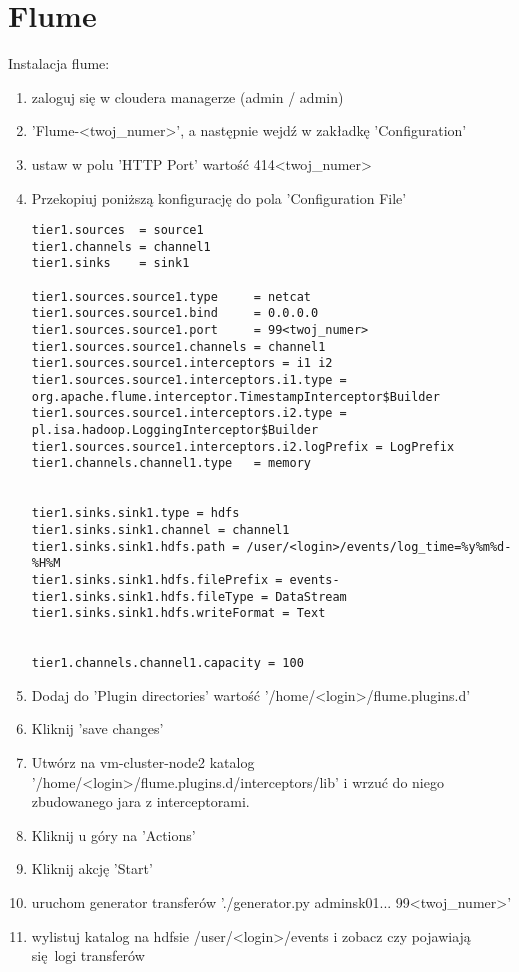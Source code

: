 \documentclass{article}
\begin{document}
\section*{Flume}

Instalacja flume:
\begin{enumerate}
\item zaloguj się w cloudera managerze (admin / admin)
\item 'Flume-<twoj\_numer>', a następnie wejdź w zakładkę 'Configuration'
\item ustaw w polu 'HTTP Port' wartość 414<twoj\_numer>
\item Przekopiuj poniższą konfigurację do pola 'Configuration File'
\begin{lstlisting}
tier1.sources  = source1
tier1.channels = channel1
tier1.sinks    = sink1

tier1.sources.source1.type     = netcat
tier1.sources.source1.bind     = 0.0.0.0
tier1.sources.source1.port     = 99<twoj_numer>
tier1.sources.source1.channels = channel1
tier1.sources.source1.interceptors = i1 i2
tier1.sources.source1.interceptors.i1.type = org.apache.flume.interceptor.TimestampInterceptor$Builder
tier1.sources.source1.interceptors.i2.type = pl.isa.hadoop.LoggingInterceptor$Builder
tier1.sources.source1.interceptors.i2.logPrefix = LogPrefix
tier1.channels.channel1.type   = memory


tier1.sinks.sink1.type = hdfs
tier1.sinks.sink1.channel = channel1
tier1.sinks.sink1.hdfs.path = /user/<login>/events/log_time=%y%m%d-%H%M
tier1.sinks.sink1.hdfs.filePrefix = events-
tier1.sinks.sink1.hdfs.fileType = DataStream
tier1.sinks.sink1.hdfs.writeFormat = Text


tier1.channels.channel1.capacity = 100
\end{lstlisting}
\item Dodaj do 'Plugin directories' wartość '/home/<login>/flume.plugins.d'
\item Kliknij 'save changes'
\item Utwórz na vm-cluster-node2 katalog '/home/<login>/flume.plugins.d/interceptors/lib' i wrzuć do niego zbudowanego jara z interceptorami.
\item Kliknij u góry na 'Actions'
\item Kliknij akcję 'Start'
\item uruchom generator transferów './generator.py adminsk01... 99<twoj\_numer>'
\item wylistuj katalog na hdfsie /user/<login>/events i zobacz czy pojawiają się logi transferów
\end{enumerate}
\end{document}
